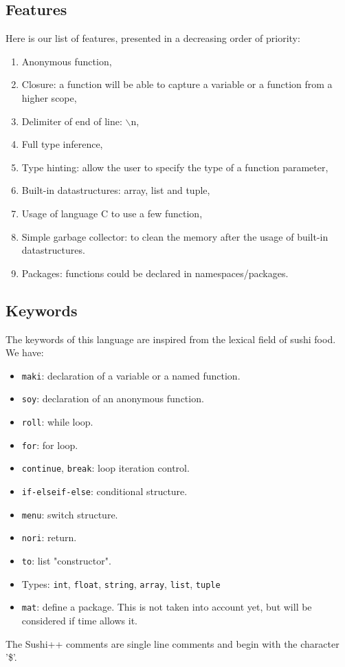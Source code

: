 \documentclass[a4paper,titlepage]{article}
\begin{document}
  \subsection{Features}
Here is our list of features, presented in a decreasing order of priority:
\begin{enumerate}
  \item Anonymous function,
  \item Closure: a function will be able to capture a variable or a function from a higher scope,
  \item Delimiter of end of line: $\backslash$n,
  \item Full type inference,
  \item Type hinting: allow the user to specify the type of a function parameter,
  \item Built-in datastructures: array, list and tuple,
  \item Usage of language C to use a few function,
  \item Simple garbage collector: to clean the memory after the usage of built-in datastructures.
  \item Packages: functions could be declared in namespaces/packages.
\end{enumerate}


  \subsection{Keywords}

The keywords of this language are inspired from the lexical field of sushi food. We have:
\begin{itemize}
  \item \texttt{maki}: declaration of a variable or a named function.
  \item \texttt{soy}: declaration of an anonymous function.
  \item \texttt{roll}: while loop.
  \item \texttt{for}: for loop.
  \item \texttt{continue}, \texttt{break}: loop iteration control. 
  \item \texttt{if-elseif-else}: conditional structure.
  \item \texttt{menu}: switch structure.
  \item \texttt{nori}: return.
  \item \texttt{to}: list "constructor". 
  \item Types: \texttt{int}, \texttt{float}, \texttt{string}, \texttt{array}, \texttt{list}, \texttt{tuple}
  \item \texttt{mat}: define a package. This is not taken into account yet, but will be considered if time allows it.
\end{itemize}
The Sushi++ comments are single line comments and begin with the character '\$'.
\end{document}
